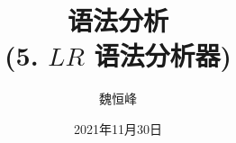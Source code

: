 \documentclass[]{beamer}
\title[语法分析]{语法分析 \\ (5. $LR$ 语法分析器)}
\author[魏恒峰]{\large 魏恒峰}
\institute{hfwei@nju.edu.cn}
\date{2021年11月30日}
\begin{document}
\maketitle



\thankyou{}

\end{document}

